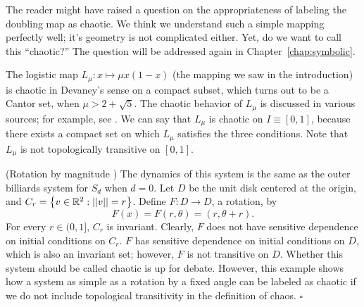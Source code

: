 \documentclass[10pt,draft,twoside]{book}
\begin{document}
The reader might have raised a question on the appropriateness of labeling the doubling map as chaotic.
We think we understand such a simple mapping perfectly well; it's geometry is not complicated either.
Yet, do we want to call this ``chaotic?''
The question will be addressed again in Chapter~\ref{chap:symbolic}.
\begin{example}
  The logistic map $L_\mu: x \mapsto \mu x(1-x)$ (the mapping we saw in the introduction) is chaotic in Devaney's sense on a compact subset, which turns out to be a Cantor set, when $\mu > 2 + \sqrt{5}$.
  The chaotic behavior of $L_\mu$ is discussed in various sources; for example, see \citet{sternberg}.
  We can say that $L_\mu$ is chaotic on $I \equiv [0,1]$, because there exists a compact set on which $L_\mu$ satisfies the three conditions.
  Note that $L_\mu$ is not topologically transitive on $[0,1]$.
\end{example} 
\begin{example}
  (Rotation by magnitude \citep{martelli})
  The dynamics of this system is the same as the outer billiards system for $S_d$ when $d = 0$.
  Let $D$ be the unit disk centered at the origin, and $C_r = \left \{ v \in \mathbb{R}^2: \left|\left| v \right|\right| = r \right \}$.
  Define $F: D \to D$, a rotation, by 
  \begin{equation*}
    F(x) = F(r, \theta) = (r, \theta + r).
  \end{equation*}
  For every $r \in (0,1]$, $C_r$ is invariant.
  Clearly, $F$ does not have sensitive dependence on initial conditions on $C_r$.
  $F$ has sensitive dependence on initial conditions on $D$, which is also an invariant set; however, $F$ is not transitive on $D$.
  Whether this system should be called chaotic is up for debate.
  However, this example shows how a system as simple as a rotation by a fixed angle can be labeled as chaotic if we do not include topological transitivity in the definition of chaos.
  $\square$
\end{example}
\end{document}

